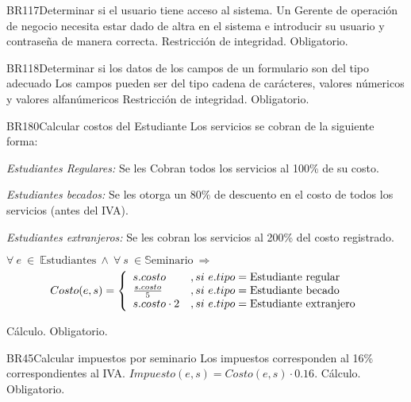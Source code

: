 \begin{BussinesRule}{BR117}{Determinar si el usuario tiene acceso al sistema.} 
	\BRitem[Descripción:] Un Gerente de operación de negocio necesita estar dado de altra en el sistema e introducir su usuario y contraseña de manera correcta.
	\BRitem[Tipo:] Restricción de integridad.
	\BRitem[Nivel:] Obligatorio.
\end{BussinesRule}

\begin{BussinesRule}{BR118}{Determinar si los datos de los campos de un formulario son del tipo adecuado} 
	\BRitem[Descripción:] Los campos pueden ser del tipo cadena de carácteres, valores númericos y valores alfanúmericos
	\BRitem[Tipo:] Restricción de integridad.
	\BRitem[Nivel:] Obligatorio.
\end{BussinesRule}

\begin{BussinesRule}{BR180}{Calcular costos del Estudiante}
	\BRitem[Descripción:] Los servicios se cobran de la siguiente forma:
		\begin{Citemize}
			\item {\em Estudiantes Regulares:} Se les Cobran todos los servicios al 100\% de su costo.
			\item {\em Estudiantes becados:} Se les otorga un 80\% de descuento en el costo de todos los servicios (antes del IVA).
			\item {\em Estudiantes extranjeros:} Se les cobran los servicios al 200\% del costo registrado.
		\end{Citemize}
	\BRitem[Sentencia:] $\forall~e~\in~\mathbb{E}\textrm{studiantes}~\land~\forall~s~\in \mathbb{S}\textrm{eminario}~\Rightarrow$
		\begin{displaymath}
			Costo(e,s) = \left\{ \begin{array}{ll}
			s.costo & , si~e.tipo = \textrm{Estudiante regular}\\
			{s.costo}\over{5} & , si~e.tipo = \textrm{Estudiante becado}\\
			s.costo \cdot 2 & , si~e.tipo = \textrm{Estudiante extranjero}
			\end{array} \right.
		\end{displaymath}

	\BRitem[Tipo:] Cálculo.
	\BRitem[Nivel:] Obligatorio.
\end{BussinesRule}

\begin{BussinesRule}{BR45}{Calcular impuestos por seminario}
	\BRitem[Descripción:] Los impuestos corresponden al 16\% correspondientes al IVA.
	\BRitem[Sentencia:] $Impuesto(e, s) = Costo(e, s)\cdot0.16$.
	\BRitem[Tipo:] Cálculo.
	\BRitem[Nivel:] Obligatorio.
\end{BussinesRule}

